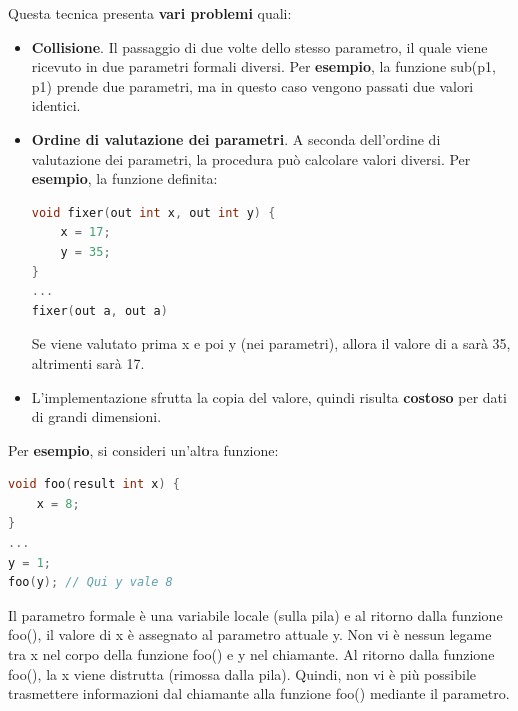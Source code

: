 \documentclass[a4paper]{article}
\begin{document}
	\noindent
	Questa tecnica presenta \textcolor{Red3}{\textbf{vari problemi}} quali:
	\begin{itemize}
		\item \textbf{Collisione}. Il passaggio di due volte dello stesso parametro, il quale viene ricevuto in due parametri formali diversi.\newline
		Per \textcolor{Green4}{\textbf{esempio}}, la funzione \textsf{sub(p1, p1)} prende due parametri, ma in questo caso vengono passati due valori identici.
		
		\item \textbf{Ordine di valutazione dei parametri}. A seconda dell'ordine di valutazione dei parametri, la procedura può calcolare valori diversi.\newline
		Per \textcolor{Green4}{\textbf{esempio}}, la funzione definita:
		\begin{lstlisting}[language=C]
void fixer(out int x, out int y) {
	x = 17;
	y = 35;
}
...
fixer(out a, out a)\end{lstlisting}
		Se viene valutato prima \textsf{x} e poi \textsf{y} (nei parametri), allora il valore di \textsf{a} sarà 35, altrimenti sarà 17.
		
		\item L'implementazione sfrutta la copia del valore, quindi risulta \textbf{costoso} per dati di grandi dimensioni.
	\end{itemize}
	Per \textcolor{Green4}{\textbf{esempio}}, si consideri un'altra funzione:
	\begin{lstlisting}[language=C]
void foo(result int x) {
	x = 8;
}
...
y = 1;
foo(y); // Qui y vale 8\end{lstlisting}
	Il parametro formale è una variabile locale (sulla pila) e al ritorno dalla funzione \textsf{foo()}, il valore di \textsf{x} è assegnato al parametro attuale \textsf{y}. Non vi è nessun legame tra \textsf{x} nel corpo della funzione \textsf{foo()} e \textsf{y} nel chiamante. Al ritorno dalla funzione \textsf{foo()}, la \textsf{x} viene distrutta (rimossa dalla pila). Quindi, non vi è più possibile trasmettere informazioni dal chiamante alla funzione \textsf{foo()} mediante il parametro.\newpage
	
\end{document}
